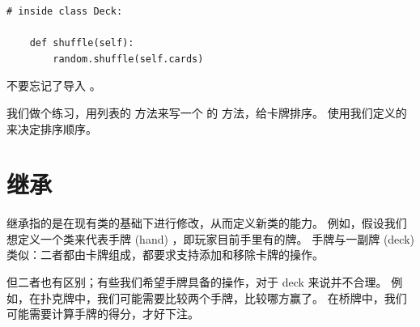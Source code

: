 \begin{lstlisting}
# inside class Deck:

    def shuffle(self):
        random.shuffle(self.cards)
\end{lstlisting}


不要忘记了导入  。


我们做个练习，用列表的  方法来写一个  的  方法，给卡牌排序。
  使用我们定义的  来决定排序顺序。

 


\section{继承}



继承指的是在现有类的基础下进行修改，从而定义新类的能力。  
例如，假设我们想定义一个类来代表手牌 (hand) ，即玩家目前手里有的牌。  
手牌与一副牌 (deck)类似：二者都由卡牌组成，都要求支持添加和移除卡牌的操作。


但二者也有区别；有些我们希望手牌具备的操作，对于 deck 来说并不合理。  
例如，在扑克牌中，我们可能需要比较两个手牌，比较哪方赢了。  
在桥牌中，我们可能需要计算手牌的得分，才好下注。


